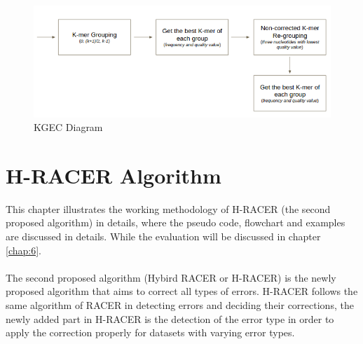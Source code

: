 \documentclass[12pt,openany]{llncs}
\begin{document}
\begin{figure}
	\centering
	\includegraphics[width=.911\linewidth]{./figs/First-Proposal-1}
	\caption{\label{fig:fig-First-Proposal-1}KGEC Diagram}
\end{figure}

\chapter{\label{chap:5}H-RACER Algorithm}
This chapter illustrates the working methodology of H-RACER (the second proposed algorithm) in details, where the pseudo code, flowchart and examples are discussed in details. While the evaluation will be discussed in chapter \ref{chap:6}.
\\
\\
The second proposed algorithm (Hybird RACER or H-RACER) is the newly proposed algorithm that aims to correct all types of errors. H-RACER follows the same algorithm of RACER in detecting errors and deciding their corrections, the newly added part in H-RACER is the detection of the error type in order to apply the correction properly for datasets with varying error types.
\end{document}
